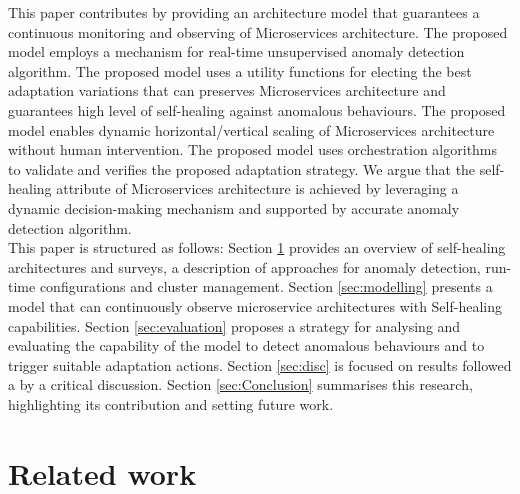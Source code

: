 \documentclass[sigconf]{acmart}
\begin{document}
This paper contributes by providing an architecture model that guarantees a continuous monitoring and observing of Microservices architecture. The proposed model employs a mechanism for real-time unsupervised anomaly detection algorithm. The proposed model uses a utility functions for electing the best adaptation variations that can preserves Microservices architecture and guarantees high level of self-healing against anomalous behaviours. The proposed model enables dynamic horizontal/vertical scaling of Microservices architecture without human intervention. The proposed model uses orchestration algorithms to validate and verifies the proposed adaptation strategy. We argue that the self-healing attribute of Microservices architecture is achieved by leveraging a dynamic decision-making mechanism and supported by accurate anomaly detection algorithm.  
\\
This paper is structured as follows: Section \ref{sec:related-work} provides an overview of self-healing architectures and surveys, a description of approaches for  anomaly detection, run-time configurations and cluster management. Section \ref{sec:modelling} presents a model that can continuously observe microservice architectures with Self-healing capabilities. Section \ref{sec:evaluation} proposes a strategy for analysing and evaluating the capability of the model  to detect anomalous behaviours and to trigger suitable adaptation actions. Section \ref{sec:disc} is focused on results followed a by a critical discussion. Section \ref{sec:Conclusion} summarises this research, highlighting its contribution and setting future work.

\section{Related work}
\label{sec:related-work}
\end{document}
